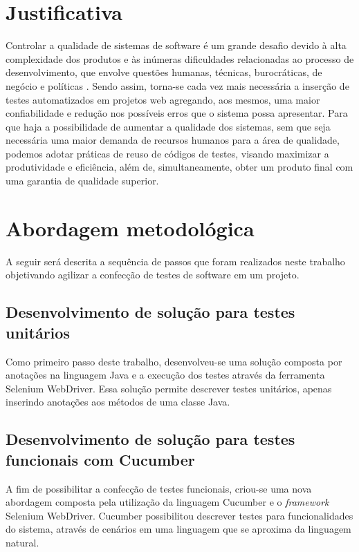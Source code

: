 \documentclass[tg]{mdtufsm}
\begin{document}
\section{Justificativa}

Controlar a qualidade de sistemas de software é um grande desafio devido à alta
complexidade dos produtos e às inúmeras dificuldades relacionadas ao processo de
desenvolvimento, que envolve questões humanas, técnicas, burocráticas, de negócio e políticas \cite{bernardo2008importancia}.
Sendo assim, torna-se cada vez mais necessária a inserção de testes automatizados em projetos web agregando, aos mesmos, uma maior confiabilidade e redução nos possíveis
erros que o sistema possa apresentar. Para que haja a possibilidade de aumentar a qualidade dos sistemas, sem que seja necessária uma maior
demanda de recursos humanos para a área de qualidade, podemos adotar práticas de reuso de códigos de testes, visando
maximizar a produtividade e eficiência, além de, simultaneamente, obter um produto final com uma garantia de qualidade
superior.

\section{Abordagem metodológica}
A seguir será descrita a sequência de passos que foram realizados neste trabalho
objetivando agilizar a confecção de testes de software em um projeto.

\subsection{Desenvolvimento de solução para testes unitários}
Como primeiro passo deste trabalho, desenvolveu-se uma solução composta por anotações na linguagem Java e a execução dos testes através da ferramenta Selenium WebDriver.
Essa solução permite descrever testes unitários, apenas inserindo anotações aos métodos de uma classe Java.

\subsection{Desenvolvimento de solução para testes funcionais com Cucumber}
A fim de possibilitar a confecção de testes funcionais, criou-se uma nova abordagem composta pela utilização da linguagem Cucumber e o \emph{framework} Selenium WebDriver.
Cucumber possibilitou descrever testes para funcionalidades do sistema, através de cenários em uma linguagem que se aproxima da linguagem natural.
\end{document}
